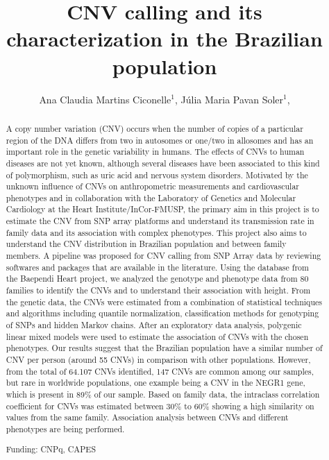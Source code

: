 \documentclass[twoside]{article}
\title{\vspace{-15mm}\fontsize{24pt}{10pt}\selectfont\textbf{ CNV calling and its characterization in the Brazilian population }} %
\author{ Ana Claudia Martins Ciconelle$^{1}$, Júlia Maria Pavan Soler$^{1}$, }
\affil{ 1 Instituto de Matemática e Estatística - IME/USP

 }
\date{}
\begin{document}
  
  
  \maketitle %
  
  
  \thispagestyle{fancy} %
  
  
  \begin{abstract}
  A copy number variation (CNV) occurs when the number of copies of a particular
region of the DNA differs from two in autosomes or one/two in allosomes and has an
important role in the genetic variability in humans. The effects of CNVs to human
diseases are not yet known, although several diseases have been associated to this kind
of polymorphism, such as uric acid and nervous system disorders. 
Motivated by the unknown influence of CNVs on anthropometric measurements and
cardiovascular phenotypes and in collaboration with the Laboratory of Genetics and
Molecular Cardiology at the Heart Institute/InCor-FMUSP, the primary aim in this
project is to estimate the CNV from SNP array platforms and understand its
transmission rate in family data and its association with complex phenotypes.  This
project also aims to understand the CNV distribution in Brazilian population and
between family members.
A pipeline was proposed for CNV calling from SNP Array data by reviewing softwares
and packages that are available in the literature. Using the database from the Baependi
Heart project, we analyzed the genotype and phenotype data from 80 families to identify
the CNVs and to understand their association with height. From the genetic data, the
CNVs were estimated from a combination of statistical techniques and algorithms
including quantile normalization, classification methods for genotyping of SNPs and
hidden Markov chains. After an exploratory data analysis, polygenic linear mixed
models were used to estimate the association of CNVs with the chosen phenotypes. 
Our results suggest that the Brazilian population have a similar number of CNV per
person (around 55 CNVs) in comparison with other populations. However, from the
total of 64.107 CNVs identified, 147 CNVs are common among our samples, but rare in
worldwide populations, one example being a CNV in the NEGR1 gene, which is present
in 89\% of our sample. Based on family data, the intraclass correlation coefficient for
CNVs was estimated between 30\% to 60\% showing a high similarity on values from the
same family. Association analysis between CNVs and different phenotypes are being
performed.
  
  Funding: CNPq, CAPES \\ 
  \end{abstract}
  
\end{document}

